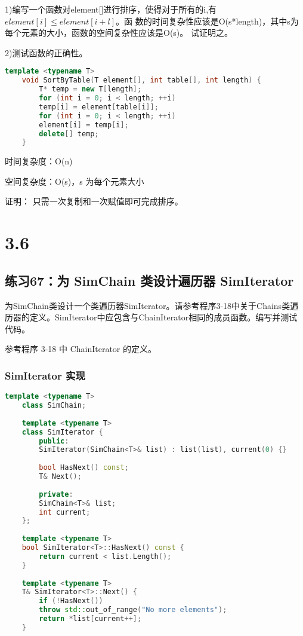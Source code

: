 \documentclass[UTF8]{ctexart}
\begin{document}
1)编写一个函数对element[]进行排序，使得对于所有的i,有$element[i]\leq element[i+l]$。函
数的时间复杂性应该是O(s*length)，其中s为每个元素的大小，函数的空间复杂性应该是O(s)。
试证明之。

2)测试函数的正确性。

\begin{lstlisting}[language=C++]
	template <typename T>
	void SortByTable(T element[], int table[], int length) {
		T* temp = new T[length];
		for (int i = 0; i < length; ++i)
		temp[i] = element[table[i]];
		for (int i = 0; i < length; ++i)
		element[i] = temp[i];
		delete[] temp;
	}
\end{lstlisting}

时间复杂度：O(n)  

空间复杂度：O(s)，s 为每个元素大小

证明：
只需一次复制和一次赋值即可完成排序。
\section{3.6~~~}
\subsection*{练习67：为 SimChain 类设计遍历器 SimIterator}
为SimChain类设计一个类遍历器SimIterator。请参考程序3-18中关于Chains类遍历器的定义。SimIterator中应包含与ChainIterator相同的成员函数。编写并测试代码。

参考程序 3-18 中 ChainIterator 的定义。

\subsubsection*{SimIterator 实现}
\begin{lstlisting}[language=C++]
	template <typename T>
	class SimChain;
	
	template <typename T>
	class SimIterator {
		public:
		SimIterator(SimChain<T>& list) : list(list), current(0) {}
		
		bool HasNext() const;
		T& Next();
		
		private:
		SimChain<T>& list;
		int current;
	};
	
	template <typename T>
	bool SimIterator<T>::HasNext() const {
		return current < list.Length();
	}
	
	template <typename T>
	T& SimIterator<T>::Next() {
		if (!HasNext())
		throw std::out_of_range("No more elements");
		return *list[current++];
	}
\end{lstlisting}
\end{document}
